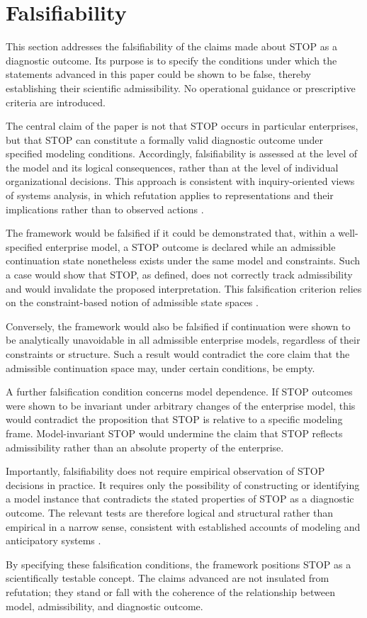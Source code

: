 ﻿\section{Falsifiability}

This section addresses the falsifiability of the claims made about STOP as a diagnostic outcome. Its purpose is to specify the conditions under which the statements advanced in this paper could be shown to be false, thereby establishing their scientific admissibility. No operational guidance or prescriptive criteria are introduced.

The central claim of the paper is not that STOP occurs in particular enterprises, but that STOP can constitute a formally valid diagnostic outcome under specified modeling conditions. Accordingly, falsifiability is assessed at the level of the model and its logical consequences, rather than at the level of individual organizational decisions. This approach is consistent with inquiry-oriented views of systems analysis, in which refutation applies to representations and their implications rather than to observed actions \cite{churchman1971}.

The framework would be falsified if it could be demonstrated that, within a well-specified enterprise model, a STOP outcome is declared while an admissible continuation state nonetheless exists under the same model and constraints. Such a case would show that STOP, as defined, does not correctly track admissibility and would invalidate the proposed interpretation. This falsification criterion relies on the constraint-based notion of admissible state spaces \cite{ashby1956}.

Conversely, the framework would also be falsified if continuation were shown to be analytically unavoidable in all admissible enterprise models, regardless of their constraints or structure. Such a result would contradict the core claim that the admissible continuation space may, under certain conditions, be empty.

A further falsification condition concerns model dependence. If STOP outcomes were shown to be invariant under arbitrary changes of the enterprise model, this would contradict the proposition that STOP is relative to a specific modeling frame. Model-invariant STOP would undermine the claim that STOP reflects admissibility rather than an absolute property of the enterprise.

Importantly, falsifiability does not require empirical observation of STOP decisions in practice. It requires only the possibility of constructing or identifying a model instance that contradicts the stated properties of STOP as a diagnostic outcome. The relevant tests are therefore logical and structural rather than empirical in a narrow sense, consistent with established accounts of modeling and anticipatory systems \cite{rosen1985}.

By specifying these falsification conditions, the framework positions STOP as a scientifically testable concept. The claims advanced are not insulated from refutation; they stand or fall with the coherence of the relationship between model, admissibility, and diagnostic outcome.
